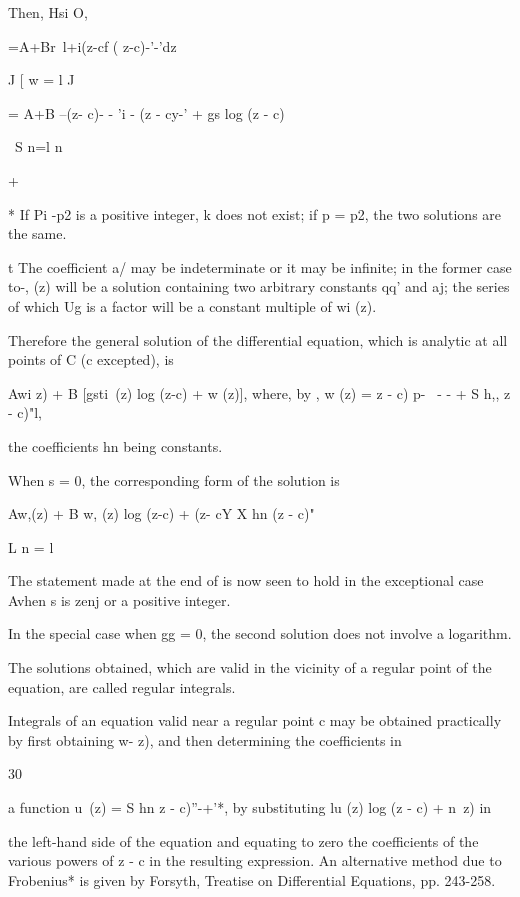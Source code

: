 Then, Hsi O,

 =A+Br\ l+i(z-cf ( z-c)-'-'dz

J [ w = l J

= A+B --(z- c)- - 'i - (z - cy-' + gs log (z - c)

\ S n=l n

+ %

* If Pi -p2 is a positive integer, k does not exist; if p = p2, the
two solutions are the same.

t The coefficient a/ may be indeterminate or it may be infinite; in
the former case to-, (z) will be a solution containing two arbitrary
constants qq' and aj; the series of which Ug is a factor will be a
constant multiple of wi (z).

%
%

Therefore the general solution of the differential equation, which is
analytic at all points of C (c excepted), is

Awi z) + B [gsti\ (z) log (z-c) + w (z)], where, by , w (z) = z
- c) p- \ - - + S h,, z - c)"l,

the coefficients hn being constants.

When s = 0, the corresponding form of the solution is

Aw,(z) + B w, (z) log (z-c) + (z- cY X hn (z - c)"

L n = l \

The statement made at the end of  is now seen to hold in the
exceptional case Avhen s is zenj or a positive integer.

In the special case when gg = 0, the second solution does not involve
a logarithm.

The solutions obtained, which are valid in the vicinity of a regular
point of the equation, are called regular integrals.

Integrals of an equation valid near a regular point c may be obtained
practically by first obtaining w- z), and then determining the
coefficients in

30

a function u\ (z) = S hn z - c)''-+'*, by substituting lu (z) log (z -
c) + n\ z) in

the left-hand side of the equation and equating to zero the
coefficients of the various powers of z - c in the resulting
expression. An alternative method due to Frobenius* is given by
Forsyth, Treatise on Differential Equations, pp. 243-258.

